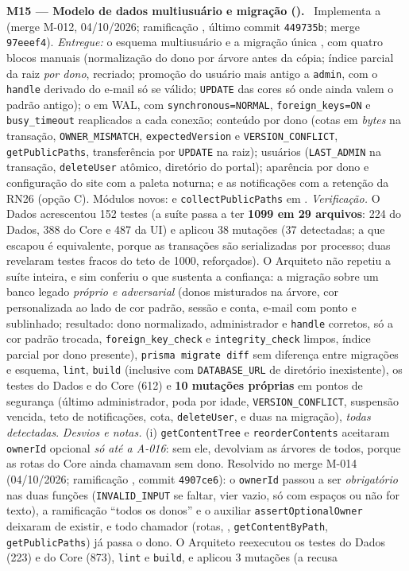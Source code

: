\textbf{M15 --- Modelo de dados multiusuário e migração ().} \ Implementa a  (merge M-012, 04/10/2026; ramificação , último commit \texttt{449735b}; merge \texttt{97eeef4}). \emph{Entregue:} o esquema multiusuário e a migração única , com quatro blocos manuais (normalização do dono por árvore antes da cópia; índice parcial da raiz \emph{por dono}, recriado; promoção do usuário mais antigo a \texttt{admin}, com o \texttt{handle} derivado do e-mail só se válido; \texttt{UPDATE} das cores só onde ainda valem o padrão antigo); o  em WAL, com \texttt{synchronous=NORMAL}, \texttt{foreign\_keys=ON} e \texttt{busy\_timeout} reaplicados a cada conexão; conteúdo por dono (cotas em \emph{bytes} na transação, \texttt{OWNER\_MISMATCH}, \texttt{expectedVersion} e \texttt{VERSION\_CONFLICT}, \texttt{getPublicPaths}, transferência por \texttt{UPDATE} na raiz); usuários (\texttt{LAST\_ADMIN} na transação, \texttt{deleteUser} atômico, diretório do portal); aparência por dono e configuração do site com a paleta noturna; e as notificações com a retenção da RN26 (opção C). Módulos novos:  e \texttt{collectPublicPaths} em . \emph{Verificação.} O Dados acrescentou 152 testes (a suíte passa a ter \textbf{1099 em 29 arquivos}: 224 do Dados, 388 do Core e 487 da UI) e aplicou 38 mutações (37 detectadas; a que escapou é equivalente, porque as transações são serializadas por processo; duas revelaram testes fracos do teto de 1000, reforçados). O Arquiteto não repetiu a suíte inteira, e sim conferiu o que sustenta a confiança: a migração sobre um banco legado \emph{próprio e adversarial} (donos misturados na árvore, cor personalizada ao lado de cor padrão, sessão e conta, e-mail com ponto e sublinhado; resultado: dono normalizado, administrador e \texttt{handle} corretos, só a cor padrão trocada, \texttt{foreign\_key\_check} e \texttt{integrity\_check} limpos, índice parcial por dono presente), \texttt{prisma migrate diff} sem diferença entre migrações e esquema, \texttt{lint}, \texttt{build} (inclusive com \texttt{DATABASE\_URL} de diretório inexistente), os testes do Dados e do Core (612) e \textbf{10 mutações próprias} em pontos de segurança (último administrador, poda por idade, \texttt{VERSION\_CONFLICT}, suspensão vencida, teto de notificações, cota, \texttt{deleteUser}, e duas na migração), \emph{todas detectadas}. \emph{Desvios e notas.} (i) \texttt{getContentTree} e \texttt{reorderContents} aceitaram \texttt{ownerId} opcional \emph{só até a A-016}: sem ele, devolviam as árvores de todos, porque as rotas do Core ainda chamavam sem dono. Resolvido no merge M-014 (04/10/2026; ramificação , commit \texttt{4907ce6}): o \texttt{ownerId} passou a ser \emph{obrigatório} nas duas funções (\texttt{INVALID\_INPUT} se faltar, vier vazio, só com espaços ou não for texto), a ramificação ``todos os donos'' e o auxiliar \texttt{assertOptionalOwner} deixaram de existir, e todo chamador (rotas, , \texttt{getContentByPath}, \texttt{getPublicPaths}) já passa o dono. O Arquiteto reexecutou os testes do Dados (223) e do Core (873), \texttt{lint} e \texttt{build}, e aplicou 3 mutações (a recusa 